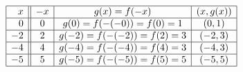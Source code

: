 \begin{table}
\[ \begin{array}{|r||c|c|c|}  

\hline

x & -x & g(x)=f(-x) & (x, g(x)) \\ \hline
0 & 0 & g(0)=f(-(-0)) = f(0) = 1   &(0, 1) \\  \hline
-2 & 2 &  g(-2)=f(-(-2)) = f(2) = 3  &(-2,3) \\  \hline
-4 & 4 & g(-4)=f(-(-4)) = f(4) = 3 &  (-4,3)\\  \hline
-5 & 5 & g(-5)=f(-(-5)) = f(5) = 5  & (-5,5) \\  \hline

\end{array} \]
\caption{}
\label{tab:fxtofminusx}
\end{table}

